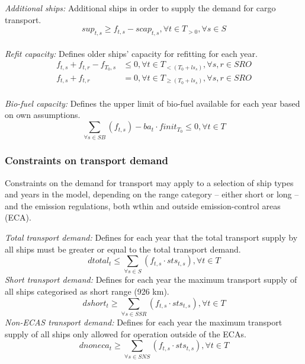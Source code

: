 \documentclass[article]{elsarticle}
\begin{document}
\textit{Additional ships: }Additional ships in order to supply the demand for cargo transport.
\begin{equation}
    sup_{t,s} \geq f_{t,s} - scap_{t,s}, \forall t \in T_{>0}, \forall s \in S\label{eq:sup}
\end{equation}\\
\textit{Refit capacity: }Defines older ships' capacity for refitting for each year.
\begin{subequations}\label{eq:refitships}
    \begin{align}
    f_{t,s} + f_{t,r} - f_{T_0, s} &\leq 0, \forall t \in T_{<\left(T_0+ls_{s}\right)}, \forall s, r \in SRO\\
    f_{t,s} + f_{t,r} & = 0, \forall t \in T_{\geq\left(T_0+ls_{s}\right)}, \forall s, r \in SRO
    \end{align}
\end{subequations}\\
\textit{Bio-fuel capacity: }Defines the upper limit of bio-fuel available for each year based on own assumptions.
\begin{equation}
    \sum_{\forall s \in SB} \left(f_{t,s} \right) - ba_{t}\cdot finit_{T_0} \leq 0, \forall t \in T\label{eq:biofuel}
\end{equation}

\subsubsection{Constraints on transport demand}
\label{subsubsec:tdemand}
Constraints on the demand for transport may apply to a selection of ship types and years in the model, depending on the range category -- either short or long -- and the emission regulations, both wthin and outside emission-control areas (ECA).\\\par\noindent
\textit{Total transport demand: }Defines for each year that the total transport supply by all ships must be greater or equal to the total transport demand.
\begin{equation}
    dtotal_t \leq \sum_{\forall s \in S} \left( f_{t,s} \cdot sts_{t,s}\right), \forall t \in T \label{eq:td_total}
\end{equation}
\textit{Short transport demand: }Defines for each year the maximum transport supply of all ships categorised as short range (926 km).
\begin{equation}
    dshort_t \geq \sum_{\forall s \in SSR} \left( f_{t,s} \cdot sts_{t,s}\right), \forall t \in T \label{eq:td_short}
\end{equation}
\textit{Non-ECAS transport demand: }Defines for each year the maximum transport supply of all ships only allowed for operation outside of the ECAs.
\begin{equation}
    dnoneca_t \geq \sum_{\forall s \in SNS} \left( f_{t,s} \cdot sts_{t,s}\right), \forall t \in T \label{eq:td_noneca}
\end{equation}
\end{document}
